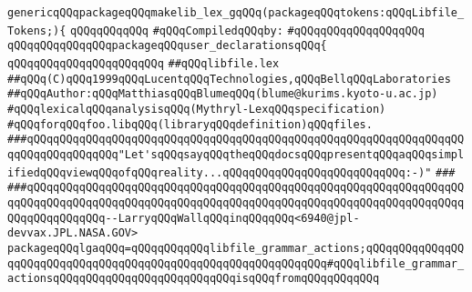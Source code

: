 \label{src/app/makelib/parse/libfile.lex.pkg}
\verb|genericqQQqpackageqQQqmakelib_lex_gqQQq(packageqQQqtokens:qQQqLibfile_Tokens;){|\newline
\verb|qQQqqQQqqQQq|\newline
\verb|#qQQqCompiledqQQqby:|\newline
\verb|#qQQqqQQqqQQqqQQqqQQq|\newline
\newline
\verb|qQQqqQQqqQQqqQQqpackageqQQquser_declarationsqQQq{|\newline
\verb|qQQqqQQqqQQqqQQqqQQqqQQq|\newline
\verb|##qQQqlibfile.lex|\newline
\verb|##qQQq(C)qQQq1999qQQqLucentqQQqTechnologies,qQQqBellqQQqLaboratories|\newline
\verb|##qQQqAuthor:qQQqMatthiasqQQqBlumeqQQq(blume@kurims.kyoto-u.ac.jp)|\newline
\newline
\newline
\newline
\verb|#qQQqlexicalqQQqanalysisqQQq(Mythryl-LexqQQqspecification)|\newline
\verb|#qQQqforqQQqfoo.libqQQq(libraryqQQqdefinition)qQQqfiles.|\newline
\newline
\newline
\newline
\newline
\verb|###qQQqqQQqqQQqqQQqqQQqqQQqqQQqqQQqqQQqqQQqqQQqqQQqqQQqqQQqqQQqqQQqqQQqqQQqqQQqqQQqqQQq"Let'sqQQqsayqQQqtheqQQqdocsqQQqpresentqQQqaqQQqsimplifiedqQQqviewqQQqofqQQqreality...qQQqqQQqqQQqqQQqqQQqqQQqqQQq:-)"|\newline
\verb|###|\newline
\verb|###qQQqqQQqqQQqqQQqqQQqqQQqqQQqqQQqqQQqqQQqqQQqqQQqqQQqqQQqqQQqqQQqqQQqqQQqqQQqqQQqqQQqqQQqqQQqqQQqqQQqqQQqqQQqqQQqqQQqqQQqqQQqqQQqqQQqqQQqqQQqqQQqqQQqqQQq--LarryqQQqWallqQQqinqQQqqQQq<6940@jpl-devvax.JPL.NASA.GOV>|\newline
\newline
\newline
\newline
\verb|packageqQQqlgaqQQq=qQQqqQQqqQQqlibfile_grammar_actions;qQQqqQQqqQQqqQQqqQQqqQQqqQQqqQQqqQQqqQQqqQQqqQQqqQQqqQQqqQQqqQQq#qQQqlibfile_grammar_actionsqQQqqQQqqQQqqQQqqQQqqQQqqQQqisqQQqfromqQQqqQQqqQQq|\newline
